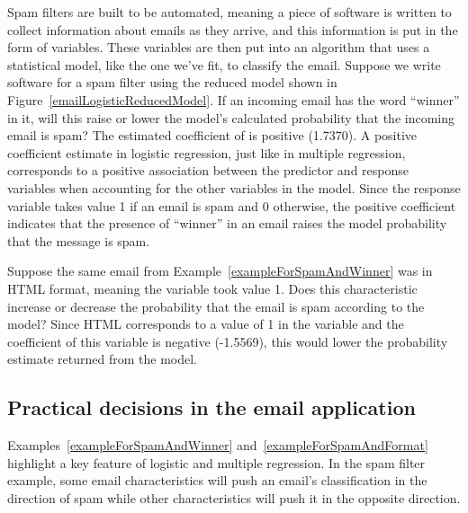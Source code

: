 \begin{example}{Spam filters are built to be automated, meaning a piece of software is written to collect information about emails as they arrive, and this information is put in the form of variables. These variables are then put into an algorithm that uses a statistical model, like the one we've fit, to classify the email. Suppose we write software for a spam filter using the reduced model shown in Figure~\ref{emailLogisticReducedModel}. If an incoming email has the word ``winner'' in it, will this raise or lower the model's calculated probability that the incoming email is spam?} \label{exampleForSpamAndWinner}
The estimated coefficient of  is positive (1.7370). A positive coefficient estimate in logistic regression, just like in multiple regression, corresponds to a positive association between the predictor and response variables when accounting for the other variables in the model. Since the response variable takes value 1 if an email is spam and 0 otherwise, the positive coefficient indicates that the presence of ``winner'' in an email raises the model probability that the message is spam.
\end{example}

\begin{example}{Suppose the same email from Example~\ref{exampleForSpamAndWinner} was in HTML format, meaning the  variable took value 1. Does this characteristic increase or decrease the probability that the email is spam according to the model?}\label{exampleForSpamAndFormat}
Since HTML corresponds to a value of 1 in the  variable and the coefficient of this variable is negative (-1.5569), this would lower the probability estimate returned from the model.
\end{example}

\subsection{Practical decisions in the email application}

Examples~\ref{exampleForSpamAndWinner} and~\ref{exampleForSpamAndFormat} highlight a key feature of logistic and multiple regression. In the spam filter example, some email characteristics will push an email's classification in the direction of spam while other characteristics will push it in the opposite direction.

